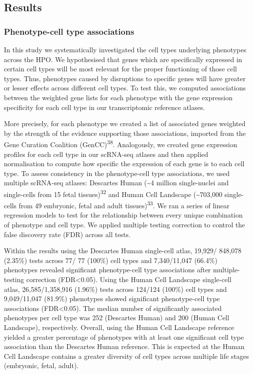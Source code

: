 \documentclass[
]{article}
\begin{document}
\subsection{Results}\label{sec-results}

\subsubsection{Phenotype-cell type
associations}\label{phenotype-cell-type-associations}

In this study we systematically investigated the cell types underlying
phenotypes across the HPO. We hypothesised that genes which are
specifically expressed in certain cell types will be most relevant for
the proper functioning of those cell types. Thus, phenotypes caused by
disruptions to specific genes will have greater or lesser effects across
different cell types. To test this, we computed associations between the
weighted gene lists for each phenotype with the gene expression
specificity for each cell type in our transcriptomic reference atlases.

More precisely, for each phenotype we created a list of associated genes
weighted by the strength of the evidence supporting those associations,
imported from the Gene Curation Coalition (GenCC)\textsuperscript{38}.
Analogously, we created gene expression profiles for each cell type in
our scRNA-seq atlases and then applied normalisation to compute how
specific the expression of each gene is to each cell type. To assess
consistency in the phenotype-cell type associations, we used multiple
scRNA-seq atlases: Descartes Human (\textasciitilde4 million
single-nuclei and single-cells from 15 fetal
tissues)\textsuperscript{32} and Human Cell Landscape
(\textasciitilde703,000 single-cells from 49 embryonic, fetal and adult
tissues)\textsuperscript{33}. We ran a series of linear regression
models to test for the relationship between every unique combination of
phenotype and cell type. We applied multiple testing correction to
control the false discovery rate (FDR) across all tests.

Within the results using the Descartes Human single-cell atlas, 19,929/
848,078 (2.35\%) tests across 77/ 77 (100\%) cell types and 7,340/11,047
(66.4\%) phenotypes revealed significant phenotype-cell type
associations after multiple-testing correction (FDR\textless0.05). Using
the Human Cell Landscape single-cell atlas, 26,585/1,358,916 (1.96\%)
tests across 124/124 (100\%) cell types and 9,049/11,047 (81.9\%)
phenotypes showed significant phenotype-cell type associations
(FDR\textless0.05). The median number of significantly associated
phenotypes per cell type was 252 (Descartes Human) and 200 (Human Cell
Landscape), respectively. Overall, using the Human Cell Landscape
reference yielded a greater percentage of phenotypes with at least one
significant cell type association than the Descartes Human reference.
This is expected at the Human Cell Landscape contains a greater
diversity of cell types across multiple life stages (embryonic, fetal,
adult).
\end{document}
